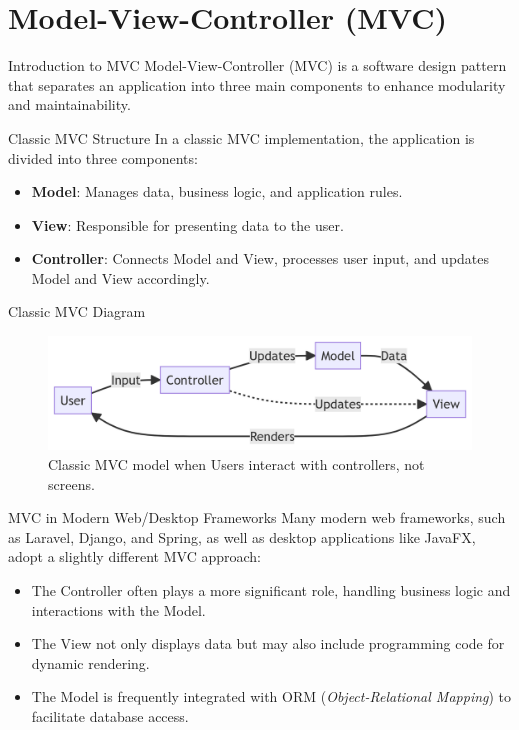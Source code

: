 \documentclass[aspectratio=169, table]{beamer}
\begin{document}
\section{Model-View-Controller (MVC)}

\begin{frame}[fragile]{Introduction to MVC}
	\vspace{20pt}
	Model-View-Controller (MVC) is a software design pattern that separates an application into three main components to enhance modularity and maintainability.
\end{frame}

\begin{frame}[fragile]{Classic MVC Structure}
	\vspace{20pt}
	In a classic MVC implementation, the application is divided into three components:
	\begin{itemize}
		\item \textbf{Model}: Manages data, business logic, and application rules.
		\item \textbf{View}: Responsible for presenting data to the user.
		\item \textbf{Controller}: Connects Model and View, processes user input, and updates Model and View accordingly.
	\end{itemize}
\end{frame}

\begin{frame}[fragile]{Classic MVC Diagram}
	\vspace{20pt}
	\begin{figure}[h]
		\centering
		\includegraphics[width=\textwidth]{../images/mvc-classic.png}
		\caption{Classic MVC model when Users interact with controllers, not screens.}
		\label{fig:mvc-classic}
	\end{figure}
\end{frame}

\begin{frame}[fragile]{MVC in Modern Web/Desktop Frameworks}
	\vspace{20pt}
	Many modern web frameworks, such as Laravel, Django, and Spring, as well as desktop applications like JavaFX, adopt a slightly different MVC approach:
	\begin{itemize}
		\item The Controller often plays a more significant role, handling business logic and interactions with the Model.
		\item The View not only displays data but may also include programming code for dynamic rendering.
		\item The Model is frequently integrated with ORM (\textit{Object-Relational Mapping}) to facilitate database access.
	\end{itemize}
\end{frame}
\end{document}

